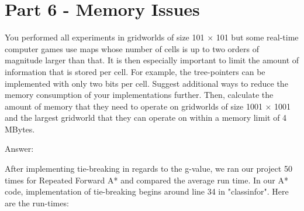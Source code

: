\documentclass{article}
\begin{document}

\section{Part 6 - Memory Issues}

You performed all experiments in gridworlds of size 101 × 101 but some real-time
computer games use maps whose number of cells is up to two orders of magnitude larger than that. It is then especially
important to limit the amount of information that is stored per cell. For example, the tree-pointers can be implemented with
only two bits per cell. Suggest additional ways to reduce the memory consumption of your implementations further. Then,
calculate the amount of memory that they need to operate on gridworlds of size 1001 × 1001 and the largest gridworld that
they can operate on within a memory limit of 4 MBytes.
\newline


Answer: \newline
\par After implementing tie-breaking in regards to the g-value, we ran our project 50 times for Repeated Forward A* and compared the average run time. In our A* code, implementation of tie-breaking begins around line 34 in "classinfor".
Here are the run-times:
\end{document}
